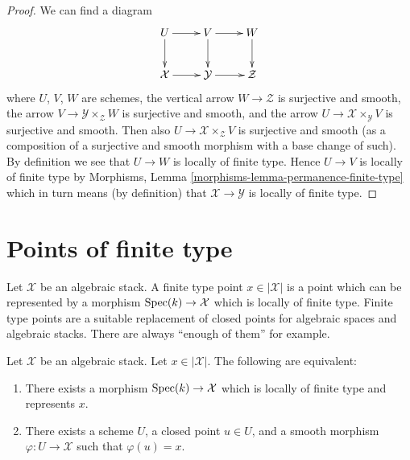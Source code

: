 \begin{proof}
We can find a diagram
$$
\xymatrix{
U \ar[r] \ar[d] & V \ar[r] \ar[d] & W \ar[d] \\
\mathcal{X} \ar[r] & \mathcal{Y} \ar[r] & \mathcal{Z}
}
$$
where $U$, $V$, $W$ are schemes, the vertical arrow $W \to \mathcal{Z}$
is surjective and smooth, the arrow $V \to \mathcal{Y} \times_\mathcal{Z} W$
is surjective and smooth, and the arrow
$U \to \mathcal{X} \times_\mathcal{Y} V$ is surjective and smooth.
Then also $U \to \mathcal{X} \times_\mathcal{Z} V$ is surjective and
smooth (as a composition of a surjective and smooth morphism with a
base change of such). By definition we see that $U \to W$ is locally
of finite type. Hence $U \to V$ is locally of finite type by
Morphisms, Lemma \ref{morphisms-lemma-permanence-finite-type}
which in turn means (by definition) that $\mathcal{X} \to \mathcal{Y}$
is locally of finite type.
\end{proof}










\section{Points of finite type}
\label{section-points-finite-type}

\noindent
Let $\mathcal{X}$ be an algebraic stack.
A finite type point $x \in |\mathcal{X}|$ is a point which can be represented
by a morphism $\mathop{\rm Spec}(k) \to \mathcal{X}$ which is locally of finite type.
Finite type points are a suitable replacement of closed points for algebraic
spaces and algebraic stacks. There are always ``enough of them'' for example.

\begin{lemma}
\label{lemma-point-finite-type}
Let $\mathcal{X}$ be an algebraic stack.
Let $x \in |\mathcal{X}|$. The following are equivalent:
\begin{enumerate}
\item There exists a morphism $\mathop{\rm Spec}(k) \to \mathcal{X}$
which is locally of finite type and represents $x$.
\item There exists a scheme $U$, a closed point $u \in U$, and a smooth
morphism $\varphi : U \to \mathcal{X}$ such that $\varphi(u) = x$.
\end{enumerate}
\end{lemma}

